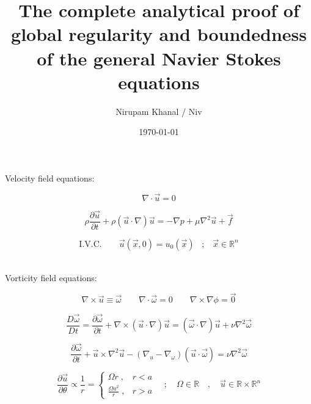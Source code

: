 \documentclass[12pt]{article}
\begin{document}
\title{The complete analytical proof of global regularity and boundedness of the general Navier Stokes equations}

\author{%
   Nirupam Khanal / Niv%
}

\date{\today}

\maketitle

\begin{center}
    {Velocity field equations:}
\end{center}
\[\nabla\cdot\vec{u} = 0\]

\[\rho \frac{\partial\vec{u}}{\partial t} + \rho (\vec{u}\cdot\nabla)\vec{u} = -\nabla p + \mu \nabla^{2} \vec{u} + \vec{f}\]

\[\text{I.V.C. }\;\;\;\;\;\; \vec u (\vec x, 0) = u_{0}(\vec x) \;\;\;;\;\;\; \vec x\in\mathbb{R}^{n} \] \\

\begin{center}
    Vorticity field equations:
\end{center}
\[\nabla \times \vec u \equiv \vec \omega \qquad \nabla \cdot \vec \omega = 0 \qquad \nabla \times \nabla \phi = \vec 0 \]

\[\frac{D \vec \omega}{Dt} = \frac{\partial \vec \omega}{\partial t} + \nabla \times (\vec u \cdot \nabla) \vec u = (\vec \omega \cdot \nabla) \vec u + \nu \nabla^{2} \vec \omega\]

\[\frac{\partial \vec \omega}{\partial t} + \vec u \times \nabla^{2} \vec u - (\nabla_{u} - \nabla_{\omega}) ( \vec u \cdot \vec \omega) = \nu \nabla^{2} \vec \omega\]

\[\frac{\partial \vec u}{\partial \theta} \propto \frac{1}{r} = \begin{cases}
    \Omega r\;, & r < a \\ 
    \frac{\Omega a^{2}}{r} \;,& r > a 
\end{cases} \quad ; \quad \Omega \in \mathbb{R} \quad , \quad \vec u \in \mathbb{R} \times \mathbb{R}^{n} \] 

\newpage 
\end{document}
